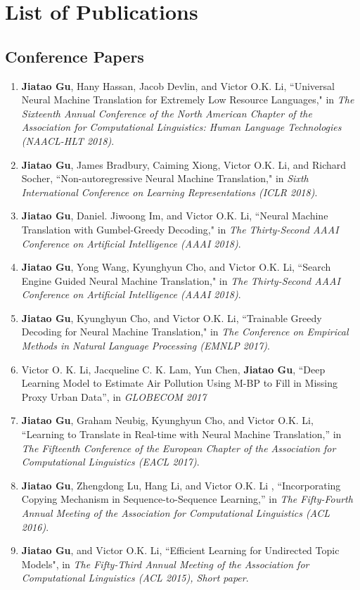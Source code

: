 \chapter*{List of Publications}

\section*{Conference Papers}

\begin{enumerate}
	\item \textbf{Jiatao Gu}, Hany Hassan, Jacob Devlin, and Victor O.K. Li, ``Universal Neural Machine Translation for Extremely Low Resource Languages," in \emph{The Sixteenth Annual Conference of the North American Chapter of the Association for Computational Linguistics: Human Language Technologies (NAACL-HLT 2018)}.
	\item \textbf{Jiatao Gu}, James Bradbury, Caiming Xiong, Victor O.K. Li, and Richard Socher, ``Non-autoregressive Neural Machine Translation," in \emph{Sixth International Conference on Learning Representations (ICLR 2018)}.
	\item \textbf{Jiatao Gu}, Daniel. Jiwoong Im, and Victor O.K. Li, ``Neural Machine Translation with Gumbel-Greedy Decoding," in \emph{The Thirty-Second AAAI Conference on Artificial Intelligence (AAAI 2018)}.
    \item \textbf{Jiatao Gu}, Yong Wang, Kyunghyun Cho, and Victor O.K. Li, ``Search Engine Guided Neural Machine Translation," in \emph{The Thirty-Second AAAI Conference on Artificial Intelligence (AAAI 2018)}.
    \item \textbf{Jiatao Gu}, Kyunghyun Cho, and Victor O.K. Li, ``Trainable Greedy Decoding for Neural Machine Translation," in \emph{The Conference on Empirical Methods in Natural Language Processing (EMNLP 2017)}.
    \item Victor O. K. Li, Jacqueline C. K. Lam, Yun Chen, \textbf{Jiatao Gu}, ``Deep Learning Model to Estimate Air Pollution Using M-BP to Fill in Missing Proxy Urban Data'', in \emph{GLOBECOM 2017}
    \item \textbf{Jiatao Gu}, Graham Neubig, Kyunghyun Cho, and Victor O.K. Li, ``Learning to Translate in Real-time with Neural Machine Translation,'' in \emph{The Fifteenth Conference of the European Chapter of the Association for Computational Linguistics (EACL 2017)}.
    \item \textbf{Jiatao Gu}, Zhengdong Lu, Hang Li, and Victor O.K. Li , ``Incorporating Copying Mechanism in Sequence-to-Sequence Learning,'' in \emph{The Fifty-Fourth Annual Meeting of the Association for Computational Linguistics (ACL 2016)}.
    \item \textbf{Jiatao Gu}, and Victor O.K. Li, ``Efficient Learning for Undirected Topic Models", in \emph{The Fifty-Third Annual Meeting of the Association for Computational Linguistics (ACL 2015), Short paper}.
\end{enumerate}

